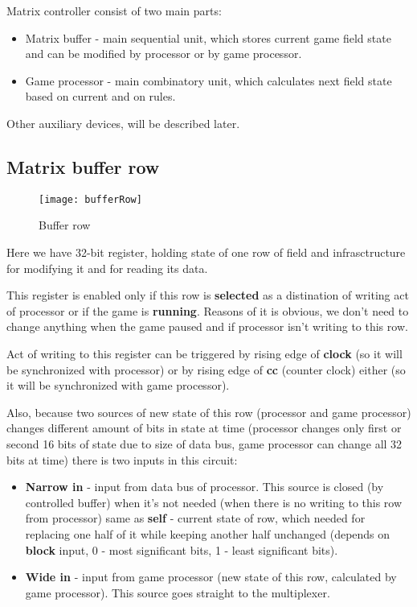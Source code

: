 Matrix controller consist of two main parts:

\begin{itemize}
	\item Matrix buffer - main sequential unit, which stores current game field state and can be modified by processor or by game processor.
	\item Game processor - main combinatory unit, which calculates next field state based on current and on rules.
\end{itemize}

Other auxiliary devices, will be described later.

\subsection*{Matrix buffer row}

\begin{figure}[ht]
	\centering
	\texttt{[image: bufferRow]}
	\caption{Buffer row}
\end{figure}

Here we have 32-bit register, holding state of one row of field and infrasctructure for modifying it and for reading its data. 

This register is enabled only if this row is \textbf{selected} as a distination of writing act of processor or if the game is \textbf{running}. Reasons of it is obvious, we don't need to change anything when the game paused and if processor isn't writing to this row.

Act of writing to this register can be triggered by rising edge of \textbf{clock} (so it will be synchronized with processor) or by rising edge of \textbf{cc} (counter clock) either (so it will be synchronized with game processor).

Also, because two sources of new state of this row (processor and game processor) changes different amount of bits in state at time (processor changes only first or second 16 bits of state due to size of data bus, game processor can change all 32 bits at time) there is two inputs in this circuit:

\begin{itemize}
	\item \textbf{Narrow in} - input from data bus of processor. This source is closed (by controlled buffer) when it's not needed (when there is no writing to this row from processor) same as \textbf{self} - current state of row, which needed for replacing one half of it while keeping another half unchanged (depends on \textbf{block} input, 0 - most significant bits, 1 - least significant bits).
	\item \textbf{Wide in} - input from game processor (new state of this row, calculated by game processor). This source goes straight to the multiplexer.
\end{itemize}

